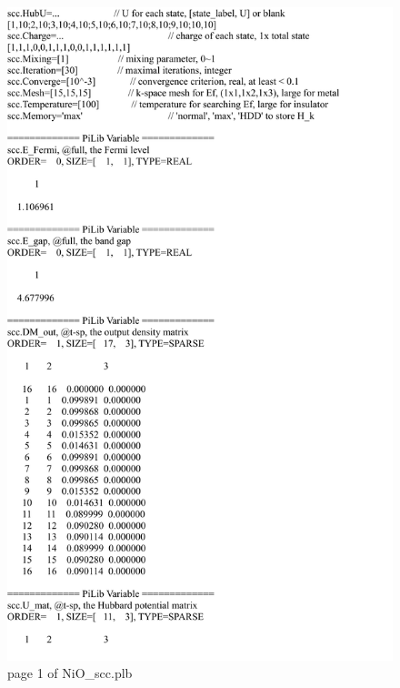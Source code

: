 \documentclass[10pt,a4paper]{article}
\begin{document}
\begin{figure}[tbp]
\centering
\includegraphics[width=0.9\columnwidth]{NiO_scc_p1.pdf}
\caption{page 1 of NiO\_scc.plb}
\end{figure}
\end{document}
